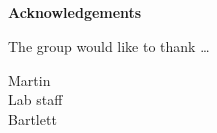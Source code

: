\begin{centering}
\chapter*{}\label{acknowledgements}
{\Huge \textbf{Acknowledgements}}

\vspace{1.5cm}

The group would like to thank \dots {}

Martin\\
Lab staff\\
Bartlett

\end{centering}
